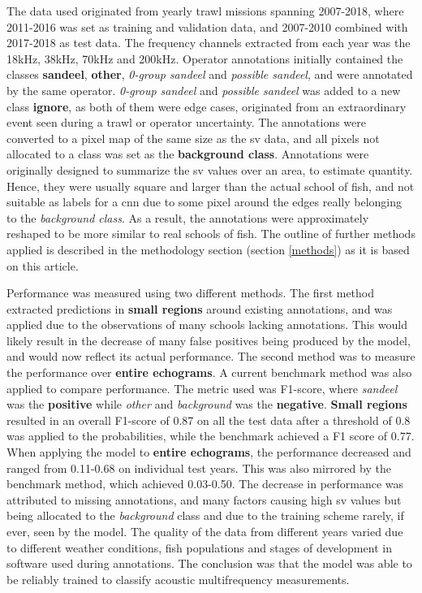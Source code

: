     The data used originated from yearly trawl missions spanning 2007-2018\cite{brautaset2020acoustic}, where 2011-2016 was set as training and validation data, and 2007-2010 combined with 2017-2018 as test data. The frequency channels extracted from each year was the 18kHz, 38kHz, 70kHz and 200kHz. Operator annotations initially contained the classes \textbf{sandeel}, \textbf{other}, \textit{0-group sandeel} and \textit{possible sandeel}, and were annotated by the same operator. \textit{0-group sandeel} and \textit{possible sandeel} was added to a new class \textbf{ignore}, as both of them were edge cases, originated from an extraordinary event seen during a trawl or operator uncertainty. The annotations were converted to a pixel map of the same size as the \gls{sv} data, and all pixels not allocated to a class was set as the \textbf{background class}. Annotations were originally designed to summarize the \gls{sv} values over an area, to estimate quantity. Hence, they were usually square and larger than the actual school of fish, and not suitable as labels for a \gls{cnn} due to some pixel around the edges really belonging to the \textit{background class}. As a result, the annotations were approximately reshaped to be more similar to real schools of fish. The outline of further methods applied is described in the methodology section (section \ref{methods}) as it is based on this article.
    
    Performance was measured using two different methods\cite{brautaset2020acoustic}. The first method extracted predictions in \textbf{small regions} around existing annotations, and was applied due to  the observations of many schools lacking annotations. This would likely result in the decrease of many false positives being produced by the model, and would now reflect its actual performance. The second method was to measure the performance over \textbf{entire echograms}. A current benchmark method was also applied to compare performance. The metric used was F1-score, where \textit{sandeel} was the \textbf{positive}   while \textit{other} and \textit{background} was the \textbf{negative}. \textbf{Small regions} resulted in an overall F1-score of 0.87 on all the test data after a threshold of 0.8 was applied to the probabilities, while the benchmark achieved a F1 score of 0.77. When applying the model to \textbf{entire echograms}, the performance decreased and ranged from 0.11-0.68 on individual test years. This was also mirrored by the benchmark method, which achieved 0.03-0.50. The decrease in performance was attributed to missing annotations, and many factors causing high \gls{sv} values but being allocated to the \textit{background} class and due to the training scheme rarely, if ever, seen by the model. The quality of the data from different years varied due to different weather conditions, fish populations and stages of development in software used during annotations. The conclusion was that the model was able to be reliably trained to classify acoustic multifrequency measurements\cite{brautaset2020acoustic}.
    
